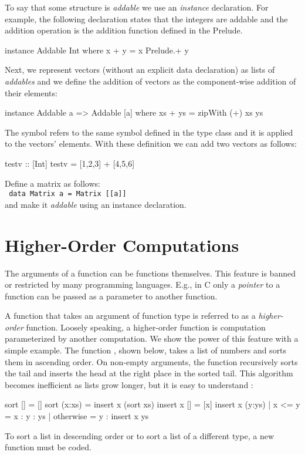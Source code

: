 To say that some structure is \emph{addable} we use an \emph{instance}
declaration.  For example, the following declaration
states that the integers are addable
and the addition operation is the addition function defined in the Prelude.
%
\begin{prog}
instance Addable Int where
  x + y = x Prelude.+ y
\end{prog}
%
Next, we represent vectors (without an explicit data declaration)
as lists of \emph{addables} and we define the addition of vectors
as the component-wise addition of their elements:
%
\begin{prog}
instance Addable a => Addable [a] where
  xs + ys = zipWith (+) xs ys
\end{prog}
%
The symbol \ccode{+} refers to the same symbol defined in the
 type class and it is applied to the vectors' elements.
With these definition we can add two vectors as follows:
%
\begin{prog}
testv :: [Int]
testv = [1,2,3] + [4,5,6]
\end{prog}
%
\begin{exercise}
  Define a matrix as follows:
  \\[2ex]
  {\tt  \phantom{WWW} data Matrix a = Matrix [[a]]}
  \\[2ex]
  and make it \emph{addable} using an instance declaration.
\end{exercise}

\section{Higher-Order Computations}
\label{Higher-Order}

The arguments of a function can be functions themselves.
This feature is banned or restricted by many programming languages.
E.g., in C only a \emph{pointer} to a function can be passed
as a parameter to another function. 

A function that takes an argument of function type is referred
to as a \emph{higher-order} function.
Loosely speaking, a higher-order function is computation parameterized
by another computation.
We show the power of this feature with a simple example.
The function , shown below,
takes a list of numbers and sorts them in ascending order.
On non-empty arguments, the function  recursively sorts the tail
and inserts the head at the right place in the sorted tail.
This algorithm becomes inefficient as lists grow longer,
but it is easy to understand
:
%
\begin{prog}
\label{InsertSort}
sort []     = []
sort (x:xs) = insert x (sort xs)
\medskip
insert x [] = [x]
insert x (y:ys) | x <= y    = x : y : ys
                | otherwise = y : insert x ys
\end{prog}
%
To sort a list in descending order or to sort a list
of a different type, a new function must be coded.

